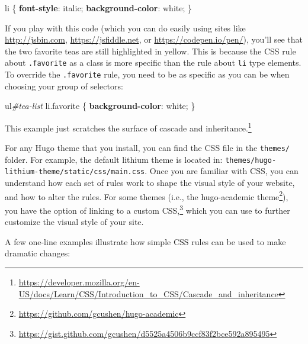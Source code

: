 \documentclass[12pt,]{krantz}
\makeatletter
\newenvironment{Shaded}{\begin{snugshade}}{\end{snugshade}}
\newcommand{\DecValTok}[1]{\textcolor[rgb]{0.00,0.00,0.81}{#1}}
\newcommand{\FunctionTok}[1]{\textcolor[rgb]{0.00,0.00,0.00}{#1}}
\newcommand{\KeywordTok}[1]{\textcolor[rgb]{0.13,0.29,0.53}{\textbf{#1}}}
\newcommand{\NormalTok}[1]{#1}
\newcommand{\PreprocessorTok}[1]{\textcolor[rgb]{0.56,0.35,0.01}{\textit{#1}}}
\renewcommand{\href}[2]{#2\footnote{\url{#1}}}
\newenvironment{kframe}{%
\medskip{}
\setlength{\fboxsep}{.8em}
 \def\at@end@of@kframe{}%
 \ifinner\ifhmode%
  \def\at@end@of@kframe{\end{minipage}}%
  \begin{minipage}{\columnwidth}%
 \fi\fi%
 \def\FrameCommand##1{\hskip\@totalleftmargin \hskip-\fboxsep
 \colorbox{shadecolor}{##1}\hskip-\fboxsep
     \hskip-\linewidth \hskip-\@totalleftmargin \hskip\columnwidth}%
 \MakeFramed {\advance\hsize-\width
   \@totalleftmargin\z@ \linewidth\hsize
   \@setminipage}}%
 {\par\unskip\endMakeFramed%
 \at@end@of@kframe}
\renewenvironment{Shaded}{\begin{kframe}}{\end{kframe}}
\theoremstyle{definition}
\theoremstyle{definition}
\theoremstyle{definition}
\theoremstyle{remark}
\makeatother
\begin{document}
\begin{Shaded}
\begin{Highlighting}[]
\NormalTok{li \{ }
  \KeywordTok{font-style}\NormalTok{: }\DecValTok{italic}\NormalTok{;}
  \KeywordTok{background-color}\NormalTok{: }\DecValTok{white}\NormalTok{;}
\NormalTok{\}}
\end{Highlighting}
\end{Shaded}

If you play with this code (which you can do easily using sites like
\url{http://jsbin.com}, \url{https://jsfiddle.net}, or
\url{https://codepen.io/pen/}), you'll see that the two favorite teas
are still highlighted in yellow. This is because the CSS rule about
\texttt{.favorite} as a class is more specific than the rule about
\texttt{li} type elements. To override the \texttt{.favorite} rule, you
need to be as specific as you can be when choosing your group of
selectors:

\begin{Shaded}
\begin{Highlighting}[]
\NormalTok{ul}\PreprocessorTok{#tea-list}\NormalTok{ li}\FunctionTok{.favorite}\NormalTok{ \{}
  \KeywordTok{background-color}\NormalTok{: }\DecValTok{white}\NormalTok{;}
\NormalTok{\}}
\end{Highlighting}
\end{Shaded}

This example just scratches the surface of
\href{https://developer.mozilla.org/en-US/docs/Learn/CSS/Introduction_to_CSS/Cascade_and_inheritance}{cascade
and inheritance.}

For any Hugo theme that you install, you can find the CSS file in the
\texttt{themes/} folder. For example, the default lithium theme is
located in: \texttt{themes/hugo-lithium-theme/static/css/main.css}. Once
you are familiar with CSS, you can understand how each set of rules work
to shape the visual style of your website, and how to alter the rules.
For some themes (i.e., the
\href{https://github.com/gcushen/hugo-academic}{hugo-academic theme}),
you have the option of linking to a
\href{https://gist.github.com/gcushen/d5525a4506b9ccf83f2bce592a895495}{custom
CSS,} which you can use to further customize the visual style of your
site.

A few one-line examples illustrate how simple CSS rules can be used to
make dramatic changes:
\end{document}
